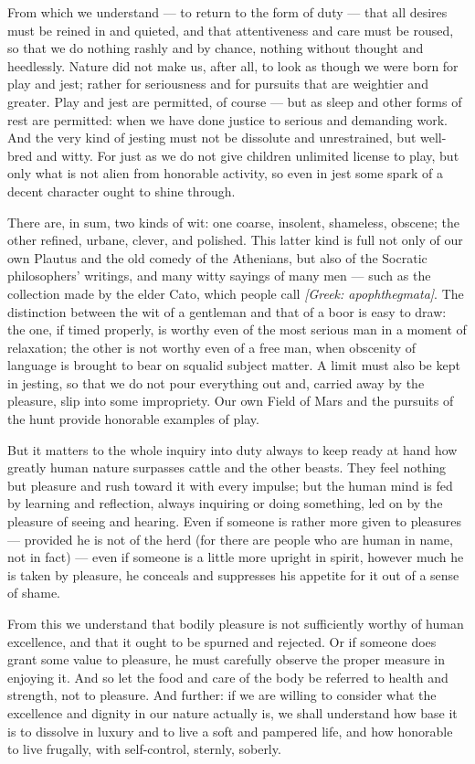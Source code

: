  From which we understand — to return to the form of duty — that all desires must be reined in and quieted, and that attentiveness and care must be roused, so that we do nothing rashly and by chance, nothing without thought and heedlessly. Nature did not make us, after all, to look as though we were born for play and jest; rather for seriousness and for pursuits that are weightier and greater. Play and jest are permitted, of course — but as sleep and other forms of rest are permitted: when we have done justice to serious and demanding work. And the very kind of jesting must not be dissolute and unrestrained, but well-bred and witty. For just as we do not give children unlimited license to play, but only what is not alien from honorable activity, so even in jest some spark of a decent character ought to shine through.

 There are, in sum, two kinds of wit: one coarse, insolent, shameless, obscene; the other refined, urbane, clever, and polished. This latter kind is full not only of our own Plautus and the old comedy of the Athenians, but also of the Socratic philosophers' writings, and many witty sayings of many men — such as the collection made by the elder Cato, which people call \textit{[Greek: apophthegmata]}. The distinction between the wit of a gentleman and that of a boor is easy to draw: the one, if timed properly, is worthy even of the most serious man in a moment of relaxation; the other is not worthy even of a free man, when obscenity of language is brought to bear on squalid subject matter. A limit must also be kept in jesting, so that we do not pour everything out and, carried away by the pleasure, slip into some impropriety. Our own Field of Mars and the pursuits of the hunt provide honorable examples of play.

 But it matters to the whole inquiry into duty always to keep ready at hand how greatly human nature surpasses cattle and the other beasts. They feel nothing but pleasure and rush toward it with every impulse; but the human mind is fed by learning and reflection, always inquiring or doing something, led on by the pleasure of seeing and hearing. Even if someone is rather more given to pleasures — provided he is not of the herd (for there are people who are human in name, not in fact) — even if someone is a little more upright in spirit, however much he is taken by pleasure, he conceals and suppresses his appetite for it out of a sense of shame.

 From this we understand that bodily pleasure is not sufficiently worthy of human excellence, and that it ought to be spurned and rejected. Or if someone does grant some value to pleasure, he must carefully observe the proper measure in enjoying it. And so let the food and care of the body be referred to health and strength, not to pleasure. And further: if we are willing to consider what the excellence and dignity in our nature actually is, we shall understand how base it is to dissolve in luxury and to live a soft and pampered life, and how honorable to live frugally, with self-control, sternly, soberly.

